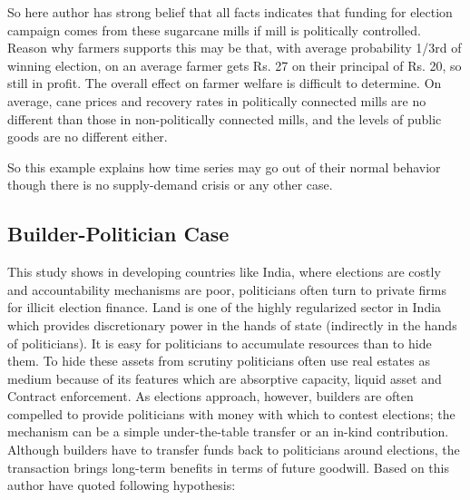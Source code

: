 So here author has strong belief that all facts indicates that funding for election campaign comes from these sugarcane mills if mill is  politically controlled. Reason why farmers supports this may be that, with average probability 1/3rd of winning election, on an average farmer gets Rs. 27 on their principal of Rs. 20, so still in profit. The overall effect on farmer welfare is difficult to determine. On average, cane prices and recovery rates in politically connected mills are no different than those in non-politically connected mills, and the levels of public goods are no different either.

So this example explains how time series may go out of their normal behavior though there is no supply-demand crisis or any other case.

\subsection{Builder-Politician Case}

This \cite{kapur2011quid} study shows in developing countries like India, where elections are costly and accountability mechanisms are poor, politicians often turn to private firms for illicit election finance. Land is one of the highly regularized sector in India which provides discretionary power in the hands of state (indirectly in the hands of politicians). It is easy for politicians to accumulate resources than to hide them. To hide these assets from scrutiny politicians often use real estates as medium because of its features which are absorptive capacity, liquid asset and Contract enforcement.
As elections approach, however, builders are often compelled to provide politicians with money with which to contest elections; the mechanism can be a simple under-the-table transfer or an in-kind contribution. Although builders have to transfer funds back to politicians around elections, the transaction brings long-term benefits in terms of future goodwill. Based on this author have quoted following hypothesis:

